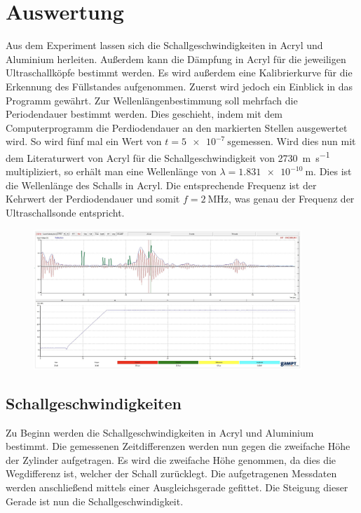 


\section{Auswertung}
\label{sec:Auswertung}

Aus dem Experiment lassen sich die Schallgeschwindigkeiten in Acryl und Aluminium herleiten. Außerdem kann die 
Dämpfung in Acryl für die jeweiligen Ultraschallköpfe bestimmt werden. Es wird außerdem eine Kalibrierkurve für 
die Erkennung des Füllstandes aufgenommen.
Zuerst wird jedoch ein Einblick in das Programm gewährt. Zur Wellenlängenbestimmung soll mehrfach die Periodendauer 
bestimmt werden. Dies geschieht, indem mit dem Computerprogramm die Perdiodendauer an den markierten Stellen 
ausgewertet wird. So wird fünf mal ein Wert von $t = \qty{5e-7}{\second}$gemessen. Wird dies nun mit dem 
Literaturwert von Acryl für die Schallgeschwindigkeit von \qty{2730}{\meter \per \second} multipliziert, so erhält 
man eine Wellenlänge von $\lambda = \qty{1.831e-10}{\meter}$. Dies ist die Wellenlänge des Schalls in Acryl. Die entsprechende 
Frequenz ist der Kehrwert der Perdiodendauer und somit $f=\qty{2}{\mega\hertz}$, was genau der Frequenz der 
Ultraschallsonde entspricht.
\begin{figure}
    \centering
    \includegraphics[width=0.9\textwidth]{PC.png}
\end{figure}

\subsection{Schallgeschwindigkeiten}
Zu Beginn werden die Schallgeschwindigkeiten in Acryl und Aluminium bestimmt. Die gemessenen Zeitdifferenzen 
werden nun gegen die zweifache Höhe der Zylinder aufgetragen. Es wird die zweifache Höhe genommen, da dies die 
Wegdifferenz ist, welcher der Schall zurücklegt. Die aufgetragenen Messdaten werden anschließend mittels einer 
Ausgleichsgerade gefittet. Die Steigung dieser Gerade ist nun die Schallgeschwindigkeit.\\

